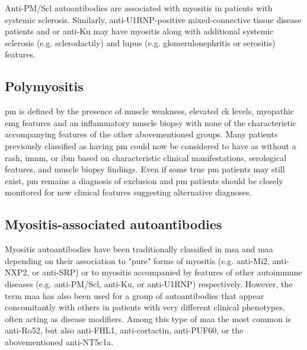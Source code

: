 Anti-PM/Scl autoantibodies are associated with myositis in patients with systemic sclerosis.\cite{GuillenDelCastillo2014} Similarly, anti-U1RNP-positive mixed-connective tissue disease patients and or anti-Ku may have myositis along with additional systemic sclerosis (e.g. sclerodactily) and lupus (e.g. glomerulonephritis or serositis) features.\cite{Rigolet2012,EscolaVerge2017}

\subsection{Polymyositis}

\gls{pm} is defined by the presence of muscle weakness, elevated \gls{ck} levels, myopathic \gls{emg} features and an inflammatory muscle biopsy with none of the characteristic accompanying features of the other abovementioned groups. Many patients previously classified as having \gls{pm} could now be considered to have \gls{as} without a rash, \gls{imnm}, or \gls{ibm} based on characteristic clinical manifestations, serological features, and muscle biopsy findings.\cite{Meulen2003,Chahin2008,Vilela2015} Even if some true \gls{pm} patients may still exist,\cite{Amato2003a} \gls{pm} remains a diagnosis of exclusion and \gls{pm} patients should be closely monitored for new clinical features suggesting alternative diagnoses.

\subsection{Myositis-associated autoantibodies}

Myositis autoantibodies have been traditionally classified in \gls{msa} and \gls{maa} depending on their association to "pure" forms of myositis (e.g. anti-Mi2, anti-NXP2, or anti-SRP) or to myositis accompanied by features of other autoimmune diseases (e.g. anti-PM/Scl, anti-Ku, or anti-U1RNP) respectively.\cite{McHugh2018} However, the term \gls{maa} has also been used for a group of autoantibodies that appear concomitantly with others in patients with very different clinical phenotypes, often acting as disease modifiers. Among this type of \gls{maa} the most common is anti-Ro52,\cite{PinalFernandez2017a,Vancsa2009,Bauhammer2016,Marie2012} but also anti-FHL1,\cite{Albrecht2015} anti-cortactin,\cite{LabradorHorrillo2014a} anti-PUF60,\cite{Fiorentino2016,Zhang2018} or the abovementioned anti-NT5c1a.\cite{Lloyd2016,Herbert2016,Muro2017,Lilleker2017,Goyal2016}

